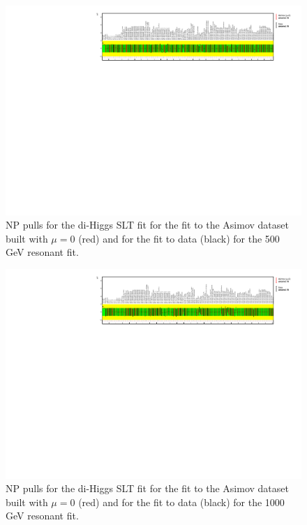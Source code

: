 \begin{figure}
\centering
\includegraphics[angle=270]{figures/results/HH/LepHad/NP_allExceptGammas_2HDM500_SLT.pdf}
\caption{NP pulls for the di-Higgs \lephad SLT fit for the fit to the Asimov dataset built with $\mu=0$ (red) and for the fit to data (black) for the 500 GeV  resonant fit.}
\label{fig:LepHadPostfitNPPulls2HDM500SLT}
\end{figure}

\begin{figure}
\centering
\includegraphics[angle=270]{figures/results/HH/LepHad/NP_allExceptGammas_2HDM1000_SLT.pdf}
\caption{NP pulls for the di-Higgs \lephad SLT fit for the fit to the Asimov dataset built with $\mu=0$ (red) and for the fit to data (black) for the 1000 GeV resonant fit.}
\label{fig:LepHadPostfitNPPulls2HDM1000SLT}
\end{figure}


